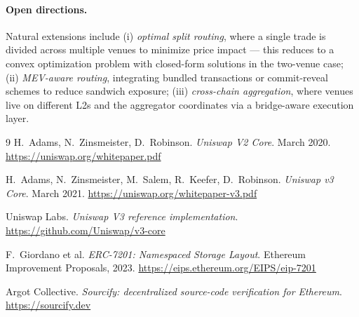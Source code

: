\documentclass[11pt,a4paper]{article}
\theoremstyle{definition}
\begin{document}
\paragraph{Open directions.}
Natural extensions include (i) \emph{optimal split routing}, where a single
trade is divided across multiple venues to minimize price impact --- this
reduces to a convex optimization problem with closed-form solutions in the
two-venue case; (ii) \emph{MEV-aware routing}, integrating bundled
transactions or commit-reveal schemes to reduce sandwich exposure; (iii)
\emph{cross-chain aggregation}, where venues live on different L2s and the
aggregator coordinates via a bridge-aware execution layer.

\begin{thebibliography}{9}
    H.~Adams, N.~Zinsmeister, D.~Robinson.
    \textit{Uniswap V2 Core}.
    March 2020.
    \url{https://uniswap.org/whitepaper.pdf}

    H.~Adams, N.~Zinsmeister, M.~Salem, R.~Keefer, D.~Robinson.
    \textit{Uniswap v3 Core}.
    March 2021.
    \url{https://uniswap.org/whitepaper-v3.pdf}

    Uniswap Labs.
    \textit{Uniswap V3 reference implementation}.
    \url{https://github.com/Uniswap/v3-core}

    F.~Giordano et al.
    \textit{ERC-7201: Namespaced Storage Layout}.
    Ethereum Improvement Proposals, 2023.
    \url{https://eips.ethereum.org/EIPS/eip-7201}

    Argot Collective.
    \textit{Sourcify: decentralized source-code verification for Ethereum}.
    \url{https://sourcify.dev}
\end{thebibliography}
\end{document}

